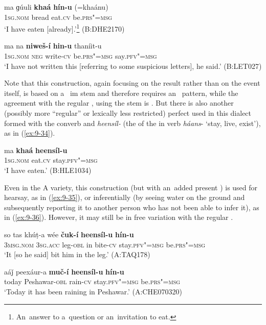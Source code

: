 \begin{exe}
\ex
\label{ex:9-32}
\gll ma ɡúuli \textbf{khaá} \textbf{hín-u} (=khaánu)\\
\textsc{1sg.nom} bread eat.\textsc{cv} be.\textsc{prs"=msg} \\
\glt `I have eaten [already].'\footnote{An~answer to a~question or an~invitation to eat.} (B:DHE2170)

\ex
\label{ex:9-33}
\gll ma na \textbf{niweš-í} \textbf{hin-u} thaníit-u\\
\textsc{1sg.nom} \textsc{neg} write-\textsc{cv} be.\textsc{prs"=msg} say.\textsc{pfv"=msg} \\
\glt `I have not written this [referring to some suspicious letters], he said.' (B:LET027)
\end{exe}

Note that this construction, again focusing on the result rather than on the event itself, is based on a~ im stem and therefore requires an~ pattern, while the agreement with the regular , using the   stem is . But there is also another (possibly more ``regular'' or lexically less restricted) perfect used in this dialect formed with the converb and \textit{heensíl-} (the  of the in verb \textit{háans}- `stay, live, exist'), as in (\ref{ex:9-34}).

\begin{exe}
\ex
\label{ex:9-34}
\gll ma \textbf{khaá} \textbf{heensíl-u}  \\
\textsc{1sg.nom} eat.\textsc{cv} stay.\textsc{pfv"=msg} \\
\glt `I have eaten.' (B:HLE1034)
\end{exe}

Even in the A variety, this construction (but with an~added present ) is used for hearsay, as in (\ref{ex:9-35}), or inferentially (by seeing water on the ground and subsequently reporting it to another person who has not been able to infer it), as in (\ref{ex:9-36}). However, it may still be in free variation with the regular .

\begin{exe}
\ex
\label{ex:9-35}
\gll so tas khúṭ-a wée \textbf{čuk-í} \textbf{heensíl-u} \textbf{hín-u} \\
\textsc{3msg.nom} \textsc{3sg.acc} leg-\textsc{obl} in bite-\textsc{cv} stay.\textsc{pfv"=msg} be.\textsc{prs"=msg} \\
\glt `It [so he said] bit him in the leg.' (A:TAQ178)

\ex
\label{ex:9-36}
\gll aáǰ peexáur-a \textbf{muč-í} \textbf{heensíl-u} \textbf{hín-u}  \\
today Peshawar-\textsc{obl} rain-\textsc{cv} stay.\textsc{pfv"=msg} be.\textsc{prs"=msg} \\
\glt `Today it has been raining in Peshawar.' (A:CHE070320)
\end{exe}

